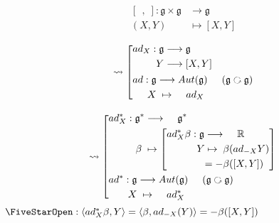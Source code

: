 \documentclass[11pt]{amsart}
\numberwithin{equation}{section}
\theoremstyle{plain}
\theoremstyle{plain}
\numberwithin{equation}{section}
\theoremstyle{remark}
\begin{document}
\begin{minipage}[t]{.5\textwidth}

\begin{equation*}
\begin{aligned}
[\;\,,\;]:\mathfrak{g} \times \mathfrak{g}&\longrightarrow \mathfrak{g}\\
(X,Y) &\mapsto [X,Y]
\end{aligned}
\end{equation*}

\begin{equation*}
\rightsquigarrow \left[
\begin{lgathered}
\begin{aligned}
ad_X:\mathfrak{g}&\longrightarrow \mathfrak{g}\\
Y&\longrightarrow [X,Y]
\end{aligned}\\
\begin{aligned}
ad:\mathfrak{g}&\longrightarrow Aut(\mathfrak{g})\hspace{0.5cm}(\mathfrak{g} \text{ \rotatebox[origin=c]{270}{$\circlearrowleft$} } \mathfrak{g})\\
X &\;\mapsto \hspace{0.4cm} ad_X
\end{aligned}
\end{lgathered} \right.
\end{equation*}

\begin{equation*}
\rightsquigarrow \left[
\begin{lgathered}
\begin{aligned}
ad_X^*:\mathfrak{g}^*&\longrightarrow \hspace{0.4cm} \mathfrak{g}^*\\
\beta \;&\mapsto \left[
\begin{aligned}
ad_X^* \beta : \mathfrak{g} \longrightarrow & \hspace{0.5cm} \mathbb{R}\\
Y \mapsto\;\; &\beta (ad_{-X}Y)\\
=-&\beta([X,Y])
\end{aligned}
\right]
\end{aligned}\\
\begin{aligned}
ad^*:\mathfrak{g}&\longrightarrow Aut(\mathfrak{g})\hspace{0.5cm}(\mathfrak{g} \text{ \rotatebox[origin=c]{270}{$\circlearrowleft$} } \mathfrak{g})\\
X &\;\mapsto \hspace{0.4cm} ad_X^*
\end{aligned}
\end{lgathered} \right. 
\end{equation*}
$\text{\FiveStarOpen} : \left<ad_X^* \beta, Y\right>=\left<\beta, ad_{-X}(Y)\right>=-\beta([X,Y])$


\end{minipage}
\end{document}
